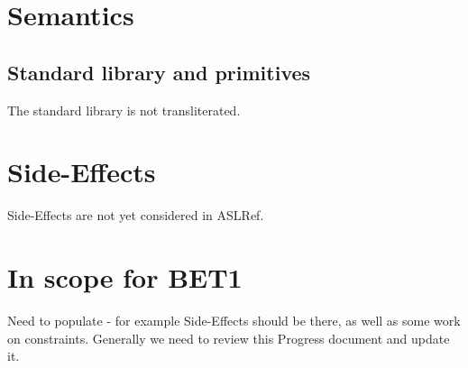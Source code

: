 \documentclass{book}
\begin{document}



\section{Semantics}






\subsection{Standard library and primitives}

The standard library is not transliterated.


\section{Side-Effects}

Side-Effects are not yet considered in ASLRef.

\section{In scope for BET1}

Need to populate - for example Side-Effects should be there, as well as some
work on constraints.
Generally we need to review this Progress document and update it.
\end{document}
